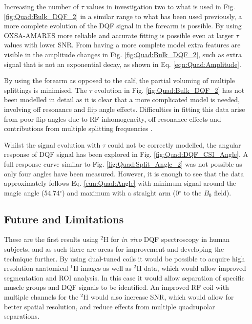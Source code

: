 
Increasing the number of $\tau$ values in investigation two to what is used in Fig. \ref{fig:Quad:Bulk_DQF_2} in a similar range to what has been used previously, a more complete evolution of the \ac{DQF} signal in the forearm is possible. By using OXSA-AMARES \cite{Purvis2017OXSA:MATLAB} more reliable and accurate fitting is possible even at larger $\tau$ values with lower SNR. From having a more complete model extra features are visible in the amplitude changes in Fig. \ref{fig:Quad:Bulk_DQF_2}, such as extra signal that is not an exponential decay, as shown in Eq. \ref{eqn:Quad:Amplitude}. 

By using the forearm as opposed to the calf, the partial voluming of multiple splittings is minimised. The $\tau$ evolution in Fig. \ref{fig:Quad:Bulk_DQF_2} has not been modelled in detail as it is clear that a more complicated model is needed, involving off resonance and flip angle effects. Difficulties in fitting this data arise from poor flip angles due to \ac{RF} inhomogeneity, off resonance effects and contributions from multiple splitting frequencies \cite{Sharf1995DetectionNMR-Spectroscopy}. 

Whilst the signal evolution with $\tau$ could not be correctly modelled, the angular response of \ac{DQF} signal has been explored in Fig. \ref{fig:Quad:DQF_CSI_Angle}. A full response curve similar to Fig. \ref{fig:Quad:Split_Angle_2} was not possible as only four angles have been measured. However, it is enough to see that the data approximately follows Eq. \ref{eqn:Quad:Angle} with minimum signal around the magic angle (54.74$^\circ$) and maximum with a straight arm (0$^\circ$ to the $B_0$ field).

\subsection{Future and Limitations}

These are the first results using $^2$H for \textit{in vivo} \ac{DQF} spectroscopy in human subjects, and as such there are areas for improvement and developing the technique further. By using dual-tuned coils it would be possible to acquire high resolution anatomical $^1$H images as well as $^2$H data, which would allow improved segmentation and \ac{ROI} analysis. In this case it would allow separation of specific muscle groups and \ac{DQF} signals to be identified. An improved \ac{RF} coil with multiple channels for the $^2$H would also increase \ac{SNR}, which would allow for better spatial resolution, and reduce effects from multiple quadrupolar separations.

